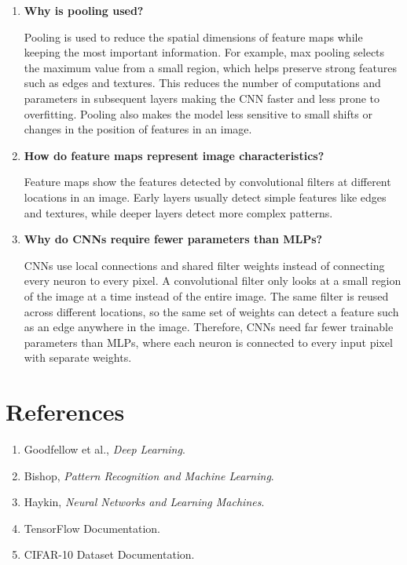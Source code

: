 \documentclass[11pt]{article}
\begin{document}
\begin{enumerate}
    \item \textbf{Why is pooling used?}
    
    \vspace{5mm}

    Pooling is used to reduce the spatial dimensions of feature maps while keeping the most important information. 
    For example, max pooling selects the maximum value from a small region, which helps preserve strong features such as edges and textures. 
    This reduces the number of computations and parameters in subsequent layers making the CNN faster and less prone to overfitting. 
    Pooling also makes the model less sensitive to small shifts or changes in the position of features in an image.
    
    \vspace{3mm}
    
    \item \textbf{How do feature maps represent image characteristics?}
    
    \vspace{5mm}

    Feature maps show the features detected by convolutional filters at different locations in an image. 
    Early layers usually detect simple features like edges and textures, while deeper layers detect more complex patterns.

    \vspace{3mm}
    \item \textbf{Why do CNNs require fewer parameters than MLPs?}

    \vspace{5mm}

    CNNs use local connections and shared filter weights instead of connecting every neuron to every pixel. 
    A convolutional filter only looks at a small region of the image at a time instead of the entire image. 
    The same filter is reused across different locations, so the same set of weights can detect a feature such as an edge anywhere in the image. 
    Therefore, CNNs need far fewer trainable parameters than MLPs, where each neuron is connected to every input pixel with separate weights.

    \vspace{3mm}
\end{enumerate}

\section{References}
\begin{enumerate}
    \item Goodfellow et al., \textit{Deep Learning}.
    \item Bishop, \textit{Pattern Recognition and Machine Learning}.
    \item Haykin, \textit{Neural Networks and Learning Machines}.
    \item TensorFlow Documentation.
    \item CIFAR-10 Dataset Documentation.
\end{enumerate}
\end{document}
